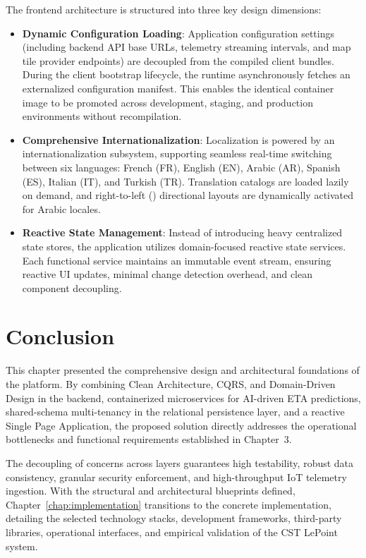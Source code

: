 The frontend architecture is structured into three key design dimensions:
\begin{itemize}
  \item \textbf{Dynamic Configuration Loading}: Application configuration settings (including backend API base URLs, telemetry streaming intervals, and map tile provider endpoints) are decoupled from the compiled client bundles. During the client bootstrap lifecycle, the runtime asynchronously fetches an externalized configuration manifest. This enables the identical container image to be promoted across development, staging, and production environments without recompilation.
  \item \textbf{Comprehensive Internationalization}: Localization is powered by an internationalization subsystem, supporting seamless real-time switching between six languages: French (FR), English (EN), Arabic (AR), Spanish (ES), Italian (IT), and Turkish (TR). Translation catalogs are loaded lazily on demand, and right-to-left () directional layouts are dynamically activated for Arabic locales.
  \item \textbf{Reactive State Management}: Instead of introducing heavy centralized state stores, the application utilizes domain-focused reactive state services. Each functional service maintains an immutable event stream, ensuring reactive UI updates, minimal change detection overhead, and clean component decoupling.
\end{itemize}

\section{Conclusion}
\label{sec:solution_conclusion}

This chapter presented the comprehensive design and architectural foundations of the  platform. By combining Clean Architecture, CQRS, and Domain-Driven Design in the backend, containerized microservices for AI-driven ETA predictions, shared-schema multi-tenancy in the relational persistence layer, and a reactive Single Page Application, the proposed solution directly addresses the operational bottlenecks and functional requirements established in Chapter~3.

The decoupling of concerns across layers guarantees high testability, robust data consistency, granular security enforcement, and high-throughput IoT telemetry ingestion. With the structural and architectural blueprints defined, Chapter~\ref{chap:implementation} transitions to the concrete implementation, detailing the selected technology stacks, development frameworks, third-party libraries, operational interfaces, and empirical validation of the CST LePoint system.
